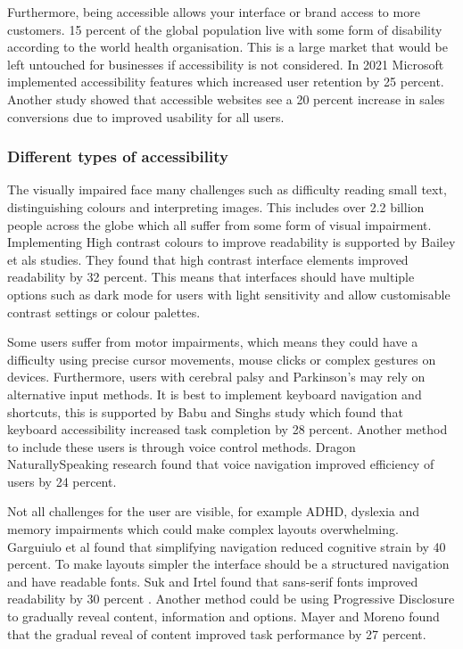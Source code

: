 \documentclass[]{project_final}
\begin{document}
Furthermore, being accessible allows your interface or brand access to more customers. 15 percent of the global population live with some form of disability according to the world health organisation. This is a large market that would be left untouched for businesses if accessibility is not considered. In 2021 Microsoft implemented accessibility features which increased user retention by 25 percent. Another study showed that accessible websites see a 20 percent increase in sales conversions due to improved usability for all users.

\subsubsection{Different types of accessibility}

The visually impaired face many challenges such as difficulty reading small text, distinguishing colours and interpreting images. This includes over 2.2 billion people across the globe which all suffer from some form of visual impairment.
Implementing High contrast colours to improve readability is supported by Bailey et als studies. They found that high contrast interface elements improved readability by 32 percent. This means that interfaces should have multiple options such as dark mode for users with light sensitivity and allow customisable contrast settings or colour palettes.\cite{noauthor_web_nodate}

Some users suffer from motor impairments, which means they could have a difficulty using precise cursor movements, mouse clicks or complex gestures on devices. Furthermore, users with cerebral palsy and Parkinson's may rely on alternative input methods.
It is best to implement keyboard navigation and shortcuts, this is supported by Babu and Singhs study which found that keyboard accessibility increased task completion by 28 percent.
Another method to include these users is through voice control methods. Dragon NaturallySpeaking research found that voice navigation improved efficiency of users by 24 percent.\cite{babu_understanding_2010}

Not all challenges for the user are visible, for example ADHD, dyslexia and memory impairments which could make complex layouts overwhelming. Garguiulo et al found that simplifying navigation reduced cognitive strain by 40 percent. To make layouts simpler the interface should be a structured navigation and have readable fonts. Suk and Irtel found that sans-serif fonts improved readability by 30 percent . Another method could be using Progressive Disclosure to gradually reveal content, information and options. Mayer and Moreno found that the gradual reveal of content improved task performance by 27 percent.\cite{sans_serif}
\end{document}
